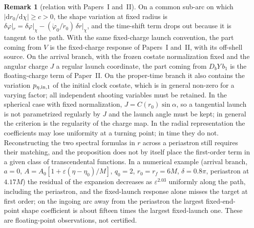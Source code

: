 \documentclass[aip,jmp,amsmath,amssymb,reprint]{revtex4-2}
\newcommand{\dd}{\mathrm{d}}
\theoremstyle{plain}
\theoremstyle{definition}
\newtheorem{remark}[proposition]{Remark}
\begin{document}
\begin{remark}[relation with Papers~I and~II]\label{rmk:adiabatic-papers}
On a common sub-arc on which $|\dd r_0/\dd\chi|\ge c>0$, the shape variation at fixed radius is
$\delta\varphi|_r=\delta\varphi|_\chi-(\dot\varphi_0/\dot r_0)\,\delta r|_\chi$, and the time-shift term drops
out because it is tangent to the path. With the same fixed-charge launch convention, the part
coming from $V$ is the fixed-charge response of Papers~I and~II, with its off-shell source. On the
arrival branch, with the frozen costate normalization fixed and the angular charge $J$ a regular
launch coordinate, the part coming from $D_bY\,b_1$ is the floating-charge term of Paper~II. On the
proper-time branch it also contains the variation $p_{\eta,{\rm in},1}$ of the initial clock costate, which
is in general non-zero for a varying factor; all independent shooting variables must be retained.
In the spherical case with fixed normalization, $J=C(r_0)\sin\alpha$, so a tangential launch is not
parametrized regularly by $J$ and the launch angle must be kept; in general the criterion is the
regularity of the charge map. In the radial representation the coefficients may lose uniformity at
a turning point; in time they do not. Reconstructing the two spectral formulas in $r$ across a
periastron still requires their matching, and the proposition does not by itself place the
first-order term in a given class of transcendental functions. In a numerical example
(arrival branch, $a=0$, $A=A_0[1+\varepsilon(\eta-\eta_0)/M]$, $q_0=2$, $r_0=r_f=6M$, $\delta=0.8\pi$,
periastron at $4.17M$) the residual of the expansion decreases as $\varepsilon^{2.03}$ uniformly along the
path, including the periastron, and the fixed-launch response alone misses the target at first
order; on the ingoing arc away from the periastron the largest fixed-end-point shape coefficient
is about fifteen times the largest fixed-launch one. These are floating-point observations, not
certified.
\end{remark}
\end{document}
